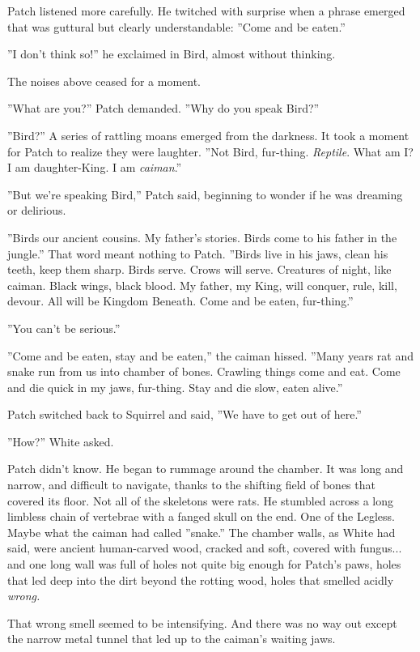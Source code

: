 \documentclass[12pt]{book}
\begin{document}
Patch listened more carefully. He twitched with surprise when a phrase emerged that was guttural but clearly understandable: ''Come and be eaten.''

''I don't think so!'' he exclaimed in Bird, almost without thinking.

The noises above ceased for a moment.

''What are you?'' Patch demanded. ''Why do you speak Bird?''

''Bird?'' A series of rattling moans emerged from the darkness. It took a moment for Patch to realize they were laughter. ''Not Bird, fur-thing. {\it Reptile}. What am I? I am daughter-King. I am {\it caiman}.''

''But we're speaking Bird,'' Patch said, beginning to wonder if he was dreaming or delirious.

''Birds our ancient cousins. My father's stories. Birds come to his father in the jungle.'' That word meant nothing to Patch. ''Birds live in his jaws, clean his teeth, keep them sharp. Birds serve. Crows will serve. Creatures of night, like caiman. Black wings, black blood. My father, my King, will conquer, rule, kill, devour. All will be Kingdom Beneath. Come and be eaten, fur-thing.''

''You can't be serious.''

''Come and be eaten, stay and be eaten,'' the caiman hissed. ''Many years rat and snake run from us into chamber of bones. Crawling things come and eat. Come and die quick in my jaws, fur-thing. Stay and die slow, eaten alive.''

Patch switched back to Squirrel and said, ''We have to get out of here.''

''How?'' White asked.

Patch didn't know. He began to rummage around the chamber. It was long and narrow, and difficult to navigate, thanks to the shifting field of bones that covered its floor. Not all of the skeletons were rats. He stumbled across a long limbless chain of vertebrae with a fanged skull on the end. One of the Legless. Maybe what the caiman had called ''snake.'' The chamber walls, as White had said, were ancient human-carved wood, cracked and soft, covered with fungus... and one long wall was full of holes not quite big enough for Patch's paws, holes that led deep into the dirt beyond the rotting wood, holes that smelled acidly {\it wrong.} 

That wrong smell seemed to be intensifying. And there was no way out except the narrow metal tunnel that led up to the caiman's waiting jaws.
\end{document}
